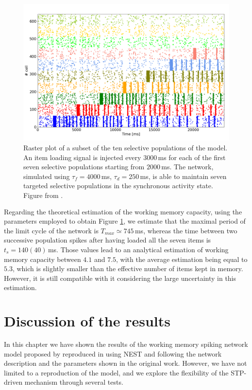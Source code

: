 \documentclass[a4paper, 12pt, twoside, openright]{book}
\begin{document}
\begin{figure}[h]
    \centering
    \includegraphics[width=0.9\columnwidth]{figures/raster_plot_7_items.png}
    \caption{Raster plot of a subset of the ten selective populations of the model. An item loading signal is injected every $3000$\,ms for each of the first seven selective populations starting from $2000$\,ms. The network, simulated using $\tau_f=4000$\,ms, $\tau_d=250$\,ms, is able to maintain seven targeted selective populations in the synchronous activity state. Figure from \cite{Tiddia2022_WM}.}
    \label{fig:rasterplot_7}
\end{figure}

Regarding the theoretical estimation of the working memory capacity, using the parameters employed to obtain Figure \ref{fig:rasterplot_7}, we estimate that the maximal period of the limit cycle of the network is $T_{max}\simeq 745$\,ms, whereas the time between two successive population spikes after having loaded all the seven items is $t_s=140(40)$\,ms. Those values lead to an analytical estimation of working memory capacity between $4.1$ and $7.5$, with the average estimation being equal to $5.3$, which is slightly smaller than the effective number of items kept in memory. However, it is still compatible with it considering the large uncertainty in this estimation.


\section{Discussion of the results}
\label{sec:WM_STP_discussion}

In this chapter we have shown the results of the working memory spiking network model proposed by \cite{Mongillo2008} reproduced in \cite{Tiddia2022_WM} using NEST and following the network description and the parameters shown in the original work. However, we have not limited to a reproduction of the model, and we explore the flexibility of the STP-driven mechanism through several tests.
\end{document}
